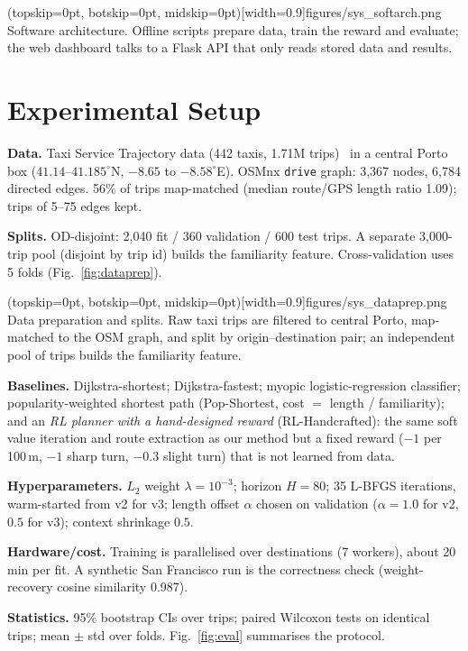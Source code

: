 \documentclass{ieeeaccess}
\begin{document}
\Figure[t!](topskip=0pt, botskip=0pt, midskip=0pt)[width=0.9\textwidth]{figures/sys_softarch.png}
{Software architecture. Offline scripts prepare data, train the reward and evaluate; the web dashboard talks to a Flask API that only reads stored data and results.\label{fig:soft}}

\section{Experimental Setup}\label{sec:setup}
\textbf{Data.} Taxi Service Trajectory data (442 taxis, 1.71M trips)~\cite{moreira2013,porto2015} in a central Porto box ($41.14$--$41.185^\circ$N, $-8.65$ to $-8.58^\circ$E). OSMnx \texttt{drive} graph: 3{,}367 nodes, 6{,}784 directed edges. 56\% of trips map-matched (median route/GPS length ratio 1.09); trips of 5--75 edges kept.

\textbf{Splits.} OD-disjoint: 2{,}040 fit / 360 validation / 600 test trips. A separate 3{,}000-trip pool (disjoint by trip id) builds the familiarity feature. Cross-validation uses 5 folds (Fig.~\ref{fig:dataprep}).

\Figure[t!](topskip=0pt, botskip=0pt, midskip=0pt)[width=0.9\textwidth]{figures/sys_dataprep.png}
{Data preparation and splits. Raw taxi trips are filtered to central Porto, map-matched to the OSM graph, and split by origin--destination pair; an independent pool of trips builds the familiarity feature.\label{fig:dataprep}}

\textbf{Baselines.} Dijkstra-shortest; Dijkstra-fastest; myopic logistic-regression classifier; popularity-weighted shortest path (Pop-Shortest, cost $=$ length / familiarity); and an \emph{RL planner with a hand-designed reward} (RL-Handcrafted): the same soft value iteration and route extraction as our method but a fixed reward ($-1$ per 100\,m, $-1$ sharp turn, $-0.3$ slight turn) that is not learned from data.

\textbf{Hyperparameters.} $L_2$ weight $\lambda=10^{-3}$; horizon $H=80$; 35 L-BFGS iterations, warm-started from v2 for v3; length offset $\alpha$ chosen on validation ($\alpha=1.0$ for v2, $0.5$ for v3); context shrinkage $0.5$.

\textbf{Hardware/cost.} Training is parallelised over destinations (7 workers), about 20 min per fit. A synthetic San Francisco run is the correctness check (weight-recovery cosine similarity 0.987).

\textbf{Statistics.} 95\% bootstrap CIs over trips; paired Wilcoxon tests on identical trips; mean $\pm$ std over folds. Fig.~\ref{fig:eval} summarises the protocol.
\end{document}

